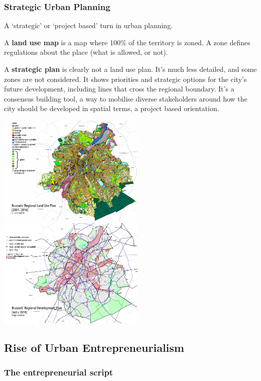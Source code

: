 \documentclass{article}
\begin{document}
\subsubsection{Strategic Urban Planning}

A `strategic' or `project based' turn in urban planning.

A \textbf{land use map} is a map where 100\% of the territory is zoned. A zone defines regulations about the place (what is allowed, or not).

A \textbf{strategic plan} is clearly not a land use plan. It's much less detailed, and some zones are not considered. It shows priorities and strategic options for the city's future development, including lines that cross the regional boundary. It's a consensus building tool, a way to mobilise diverse stakeholders around how the city should be developed in spatial terms, a project based orientation.

\begin{center}
\includegraphics[width=19em]{land_use}
\includegraphics[width=19em]{strategic_plan}
\end{center}

\subsection{Rise of Urban Entrepreneurialism}

\subsubsection{The entrepreneurial script}
\end{document}
